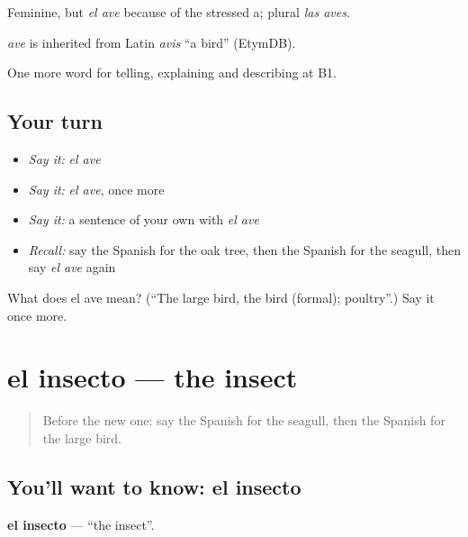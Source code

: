 Feminine, but \emph{el ave} because of the stressed a; plural \emph{las aves}.

\begin{cousinweb}
\emph{ave} is inherited from Latin \emph{avis} \textquotedblleft{}a bird\textquotedblright{} (EtymDB).
\end{cousinweb}

\begin{grammarlens}[title={What you've built}]
One more word for telling, explaining and describing at B1.
\end{grammarlens}

\subsection*{Your turn}
\begin{itemize}
\raggedright
  \item \emph{Say it:} \emph{el ave}
  \item \emph{Say it:} \emph{el ave}, once more
  \item \emph{Say it:} a sentence of your own with \emph{el ave}
  \item \emph{Recall:} say the Spanish for the oak tree, then the Spanish for the seagull, then say \emph{el ave} again
\end{itemize}

\begin{tcolorbox}[breakable,colback=teal!4,colframe=teal!35!black,title={Before you move on}]
What does el ave mean? (\textquotedblleft{}The large bird, the bird (formal); poultry\textquotedblright{}.) Say it once more.
\end{tcolorbox}
\section[el insecto]{el insecto — the insect}

\label{lesson:ES-C694-insecto}



\begin{quote}
Before the new one: say the Spanish for the seagull, then the Spanish for the large bird.
\end{quote}

\subsection*{You'll want to know: el insecto}
\textbf{el insecto} — \textquotedblleft{}the insect\textquotedblright{}.

